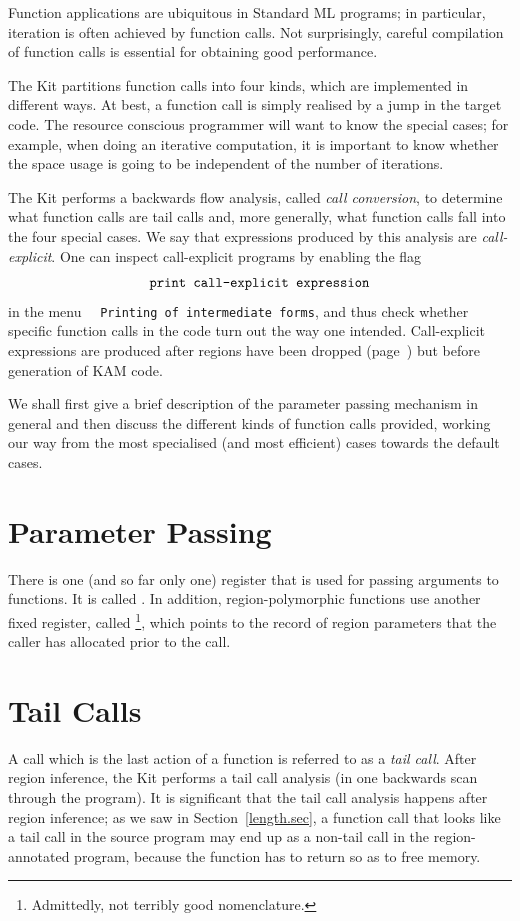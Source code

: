 \documentclass[12pt]{book}
\begin{document}
Function applications are ubiquitous in Standard ML programs; in particular, iteration
is often achieved by function calls. Not surprisingly, careful compilation of 
function calls is essential for obtaining
good performance. 

The Kit partitions function calls into four kinds, which are implemented in different ways.
At best, a function call is simply realised by a jump in the target code. 
The resource conscious programmer will want to know the special cases; for example,
when doing an iterative computation, it is important to know whether the space usage
is going to be independent of the number of iterations. 

The Kit performs a backwards flow analysis, called 
%
{\em call conversion}, to determine what function calls are tail calls
and, more generally, what function calls fall into the four special
cases. We say that expressions produced by this analysis are
%
{\em call-explicit}.\label{call-explicit} One can inspect
call-explicit programs by enabling the flag
%
$$\hbox{\tt print call-explicit expression}$$
in the menu~~
\texttt{Printing of intermediate forms}, and thus check whether
specific function calls in the code turn out the way one intended.
Call-explicit expressions are produced after regions have been dropped
(page~\pageref{bother-to-distinguish-get-n-put}) but before generation
of KAM code.

We shall first give a brief description of the parameter passing mechanism in general
and then discuss the different kinds of function calls provided, working our way from 
the most specialised (and most efficient) cases towards the default  cases.

\section{Parameter Passing}
There is one (and so far only one) register that is used for passing arguments
to functions. It is called . In addition, region-polymorphic functions
use another fixed register, 
called \footnote{Admittedly, not terribly good nomenclature.},
which points to the record of region parameters that the caller has allocated prior to the call.

\section{Tail Calls}
\label{tailcall.sec}
A call which is the last action of a function is 
referred to as a {\em tail call}. After region inference, the Kit performs a 
tail call analysis (in one backwards scan through the program). It is significant that
the tail call analysis happens after region inference;
as we saw in Section~\ref{length.sec}, a function call that
looks like a tail call in the 
source program may end up as a non-tail call in the
region-annotated program, because the function  has to return 
so as to free memory.
\end{document}
